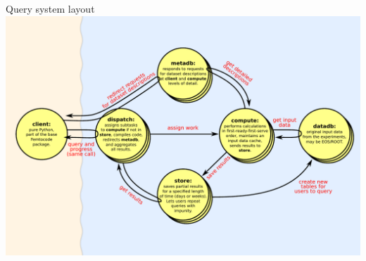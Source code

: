 \documentclass{beamer}
\begin{document}
\begin{frame}{Query system layout}
\vspace{0.15 cm}
\mbox{\hspace{-1.1 cm}\includegraphics[width=1.2\linewidth]{distributed-system-tall.pdf}}
\end{frame}
\end{document}
